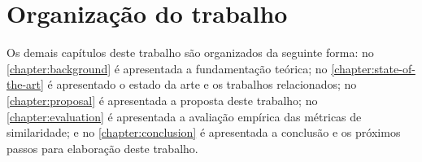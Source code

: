\section{Organização do trabalho}

Os demais capítulos deste trabalho são organizados da seguinte forma: no \autoref{chapter:background} é apresentada a fundamentação teórica; no \autoref{chapter:state-of-the-art} é apresentado o estado da arte e os trabalhos relacionados; no \autoref{chapter:proposal} é apresentada a proposta deste trabalho; no \autoref{chapter:evaluation} é apresentada a avaliação empírica das métricas de similaridade; e no \autoref{chapter:conclusion} é apresentada a conclusão e os próximos passos para elaboração deste trabalho.
